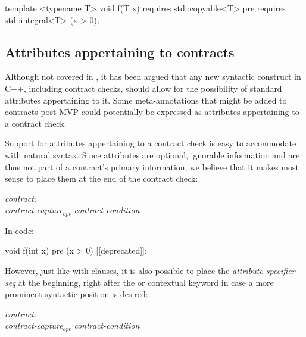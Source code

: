 \begin{codeblock}
template <typename T>
void f(T x)
  requires std::copyable<T>
  pre requires std::integral<T> (x > 0);
\end{codeblock}


\subsection{Attributes appertaining to contracts}
\label{subsec:attr}

Although not covered in \cite{P2885R3}, it has been argued that any new syntactic construct in C++, including contract checks, should allow for the possibility of standard attributes appertaining to it. Some meta-annotations that might be added to contracts post MVP could potentially be expressed as attributes appertaining to a contract check.

Support for attributes appertaining to a contract check is easy to accommodate with natural syntax. Since attributes are optional, ignorable information and are thus not part of a contract's primary information, we believe that it makes most sense to place them at the end of the contract check:

\begin{adjustwidth}{0.5cm}{0.5cm}

\emph{contract:} \\
\phantom{~~~}\emph{contract-capture}$_{opt}$ \emph{contract-condition} 

\end{adjustwidth}

In code:

\begin{codeblock}
void f(int x)
  pre (x > 0) [[deprecated]];
\end{codeblock}

However, just like with  clauses, it is also possible to place the \emph{attribute-specifier-seq} at the beginning, right after the  or  contextual keyword in case a more prominent syntactic position is desired:

\begin{adjustwidth}{0.5cm}{0.5cm}

\emph{contract:} \\
\phantom{~~~} \emph{contract-capture}$_{opt}$ \emph{contract-condition} 

\end{adjustwidth}

